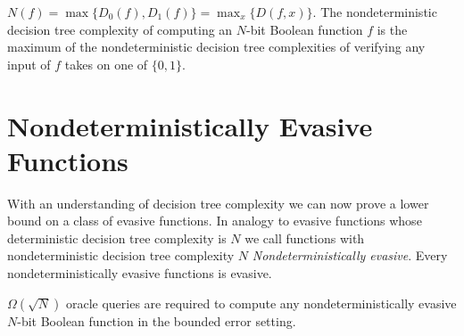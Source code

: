 \begin{defi}
\label{defi:ndc}
$N(f) = \max\{D_{0}(f),D_{1}(f)\} = \max_{x}\{D(f,x)\}$.  The
nondeterministic decision tree complexity of computing an $N$-bit
Boolean function $f$ is the maximum of the nondeterministic decision
tree complexities of verifying any input of $f$ takes on one of
$\{0,1\}$.
\end{defi}

\section{Nondeterministically Evasive Functions}
\label{sec:b4r}

With an understanding of decision tree complexity we can now prove a
lower bound on a class of evasive functions.  In analogy to evasive
functions whose deterministic decision tree complexity is $N$ we call
functions with nondeterministic decision tree complexity $N$
\emph{Nondeterministically evasive}.  Every nondeterministically evasive
functions is evasive.

\begin{theorem}
\label{th:b2r}
$\Omega(\sqrt{N})$ oracle queries are required to compute any
nondeterministically evasive $N$-bit Boolean function in the bounded
error setting.
\end{theorem}

